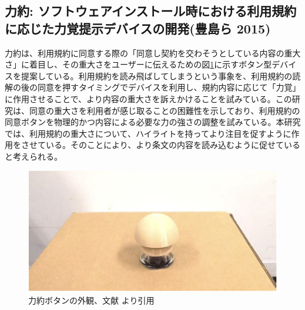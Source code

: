 \subsection{力約: ソフトウェアインストール時における利用規約に応じた力覚提示デバイスの開発(豊島ら 2015)}
力約\cite{weko_145305_1}は、利用規約に同意する際の「同意し契約を交わそうとしている内容の重大さ」に着目し、その重大さをユーザーに伝えるための図\ref{img:rikiyaku}に示すボタン型デバイスを提案している。利用規約を読み飛ばしてしまうという事象を、利用規約の読解の後の同意を押すタイミングでデバイスを利用し、規約内容に応じて「力覚」に作用させることで、より内容の重大さを訴えかけることを試みている。この研究は、同意の重大さを利用者が感じ取ることの困難性を示しており、利用規約の同意ボタンを物理的かつ内容による必要な力の強さの調整を試みている。本研究では、利用規約の重大さについて、ハイライトを持ってより注目を促すように作用をさせている。そのことにより、より条文の内容を読み込むように促せていると考えられる。
\begin{figure}[h]
  \begin{center}
      \includegraphics[width=13cm]{img/rikiyaku.png}
      \caption{力約ボタンの外観、文献\cite{weko_145305_1} より引用}
      \label{img:rikiyaku}
  \end{center}
\end{figure}